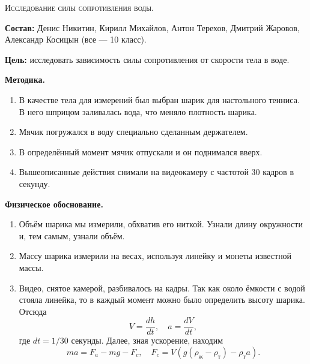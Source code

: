 \begin{center}
  \large{\textsc{Исследование силы сопротивления воды.}}
\end{center}

\textbf{Состав:} Денис Никитин, Кирилл Михайлов, Антон Терехов,
Дмитрий Жаровов, Александр Косицын (все --- 10 класс). 

\textbf{Цель:} исследовать зависимость силы сопротивления от скорости
тела в воде. 

\begin{center}
  \textbf{Методика.}  
\end{center}

\begin{enumerate}
\item В качестве тела для измерений был выбран шарик для настольного
  тенниса. В него шприцом заливалась вода, что меняло плотность
  шарика.
\item Мячик погружался в воду специально сделанным держателем.
\item В определённый момент мячик отпускали и он поднимался вверх.
\item Вышеописанные действия снимали на видеокамеру с частотой 30
  кадров в секунду. 
\end{enumerate}

\begin{center}
  \textbf{Физическое обоснование.}
\end{center}

\begin{enumerate}
\item Объём шарика мы измерили, обхватив его ниткой. Узнали длину
  окружности и, тем самым, узнали объём.
\item Массу шарика измерили на весах, используя линейку и монеты
  известной массы.
\item Видео, снятое камерой, разбивалось на кадры. Так как около
  ёмкости с водой стояла линейка, то в каждый момент можно было
  определить высоту шарика. Отсюда
  \begin{equation}
    \label{eq:bz_1}
    V = \frac{dh}{dt}, \quad a = \frac{dV}{dt},
  \end{equation}
  где $dt = 1/30$ секунды. Далее, зная ускорение, находим
  \begin{equation}
    \label{eq:bz_2}
    ma = F_a - mg - F_c, \quad F_c = V (g (\rho_{\mbox{ж}} -
    \rho_{\mbox{т}}) - \rho_{\mbox{т}} a). 
  \end{equation}
\end{enumerate}

